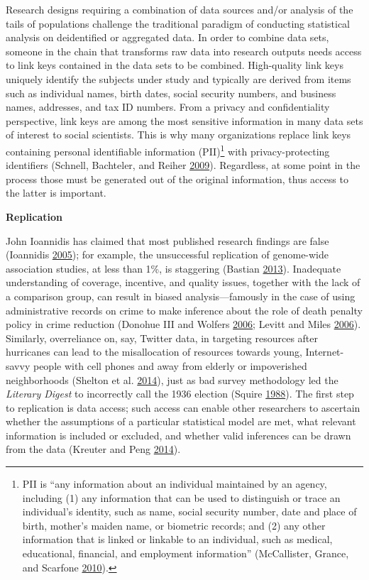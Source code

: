 \documentclass[]{krantz}
\begin{document}
Research designs requiring a combination of data sources and/or analysis
of the tails of populations challenge the traditional paradigm of
conducting statistical analysis on deidentified or aggregated data. In
order to combine data sets, someone in the chain that transforms raw
data into research outputs needs access to link keys contained in the
data sets to be combined. High-quality link keys uniquely identify the
subjects under study and typically are derived from items such as
individual names, birth dates, social security numbers, and business
names, addresses, and tax ID numbers. From a privacy and confidentiality
perspective, link keys are among the most sensitive information in many
data sets of interest to social scientists. This is why many
organizations replace link keys containing personal identifiable
information (PII)\footnote{PII is ``any information about an individual
  maintained by an agency, including (1) any information that can be
  used to distinguish or trace an individual's identity, such as name,
  social security number, date and place of birth, mother's maiden name,
  or biometric records; and (2) any other information that is linked or
  linkable to an individual, such as medical, educational, financial,
  and employment information'' (McCallister, Grance, and Scarfone
  \protect\hyperlink{ref-mccallister2010sp}{2010}).} with
privacy-protecting identifiers (Schnell, Bachteler, and Reiher
\protect\hyperlink{ref-schnell2009privacy}{2009}). Regardless, at some
point in the process those must be generated out of the original
information, thus access to the latter is important.

\textbf{Replication}

John Ioannidis has claimed that most published research findings are
false (Ioannidis \protect\hyperlink{ref-Ioannidis2005}{2005}); for
example, the unsuccessful replication of genome-wide association
studies, at less than 1\%, is staggering (Bastian
\protect\hyperlink{ref-Bastian2013}{2013}). Inadequate understanding of
coverage, incentive, and quality issues, together with the lack of a
comparison group, can result in biased analysis---famously in the case
of using administrative records on crime to make inference about the
role of death penalty policy in crime reduction (Donohue III and Wolfers
\protect\hyperlink{ref-donohue2006uses}{2006}; Levitt and Miles
\protect\hyperlink{ref-levitt2006economic}{2006}). Similarly,
overreliance on, say, Twitter data, in targeting resources after
hurricanes can lead to the misallocation of resources towards young,
Internet-savvy people with cell phones and away from elderly or
impoverished neighborhoods (Shelton et al.
\protect\hyperlink{ref-shelton2014mapping}{2014}), just as bad survey
methodology led the \emph{Literary Digest} to incorrectly call the 1936
election (Squire \protect\hyperlink{ref-squire19881936}{1988}). The
first step to replication is data access; such access can enable other
researchers to ascertain whether the assumptions of a particular
statistical model are met, what relevant information is included or
excluded, and whether valid inferences can be drawn from the data
(Kreuter and Peng \protect\hyperlink{ref-kreuter201412}{2014}).
\end{document}
